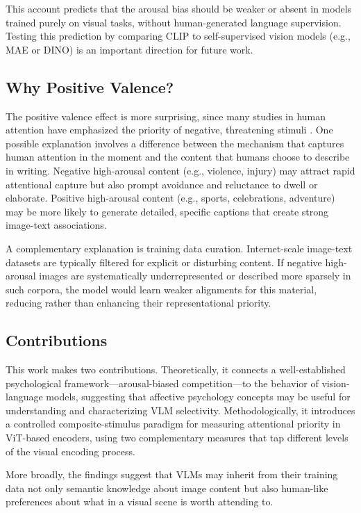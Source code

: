 \documentclass[12pt]{article}
\begin{document}
This account predicts that the arousal bias should be weaker or absent in models trained purely on visual tasks, without human-generated language supervision. Testing this prediction by comparing CLIP to self-supervised vision models (e.g., MAE or DINO) is an important direction for future work.

\subsection{Why Positive Valence?}

The positive valence effect is more surprising, since many studies in human attention have emphasized the priority of negative, threatening stimuli \citep{prattoAutomaticVigilanceAttentiongrabbing1991, macleodAttentionalBiasEmotional1986}. One possible explanation involves a difference between the mechanism that captures human attention in the moment and the content that humans choose to describe in writing. Negative high-arousal content (e.g., violence, injury) may attract rapid attentional capture but also prompt avoidance and reluctance to dwell or elaborate. Positive high-arousal content (e.g., sports, celebrations, adventure) may be more likely to generate detailed, specific captions that create strong image-text associations.

A complementary explanation is training data curation. Internet-scale image-text datasets are typically filtered for explicit or disturbing content. If negative high-arousal images are systematically underrepresented or described more sparsely in such corpora, the model would learn weaker alignments for this material, reducing rather than enhancing their representational priority.

\subsection{Contributions}

This work makes two contributions. Theoretically, it connects a well-established psychological framework---arousal-biased competition---to the behavior of vision-language models, suggesting that affective psychology concepts may be useful for understanding and characterizing VLM selectivity. Methodologically, it introduces a controlled composite-stimulus paradigm for measuring attentional priority in ViT-based encoders, using two complementary measures that tap different levels of the visual encoding process.

More broadly, the findings suggest that VLMs may inherit from their training data not only semantic knowledge about image content but also human-like preferences about what in a visual scene is worth attending to.
\end{document}
